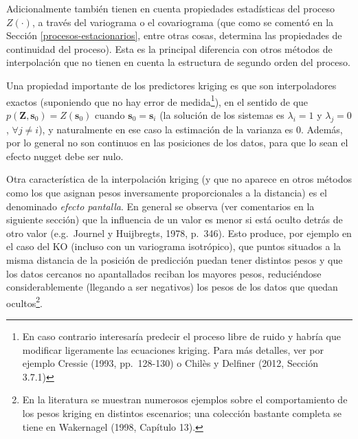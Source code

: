 \documentclass[
]{book}
\theoremstyle{break}
\theoremstyle{definition}
\theoremstyle{definition}
\theoremstyle{definition}
\theoremstyle{definition}
\theoremstyle{remark}
\begin{document}
Adicionalmente también tienen en cuenta propiedades estadísticas del proceso \(Z(\cdot)\), a través del variograma o el covariograma (que como se comentó en la Sección \ref{procesos-estacionarios}, entre otras cosas, determina las propiedades de continuidad del proceso).
Esta es la principal diferencia con otros métodos de interpolación que no tienen en cuenta la estructura de segundo orden del proceso.

Una propiedad importante de los predictores kriging es que son interpoladores exactos (suponiendo que no hay error de medida\footnote{En caso contrario interesaría predecir el proceso libre de ruido y habría que modificar ligeramente las ecuaciones kriging. Para más detalles, ver por ejemplo Cressie (1993, pp.~128-130) o Chilès y Delfiner (2012, Sección 3.7.1)}), en el sentido de que \(p(\mathbf{Z},\mathbf{s}_{0})=Z(\mathbf{s}_{0})\) cuando \(\mathbf{s}_{0}=\mathbf{s}_{i}\) (la solución de los sistemas es \(\lambda_{i} =1\) y \(\lambda_{j} =0\), \(\forall j\neq i\)), y naturalmente en ese caso la estimación de la varianza es 0.
Además, por lo general no son continuos en las posiciones de los datos, para que lo sean el efecto nugget debe ser nulo.

Otra característica de la interpolación kriging (y que no aparece en otros métodos como los que asignan pesos inversamente proporcionales a la distancia) es el denominado \emph{efecto pantalla}.
En general se observa (ver comentarios en la siguiente sección) que la influencia de un valor es menor si está oculto detrás de otro valor (e.g.~Journel y Huijbregts, 1978, p.~346).
Esto produce, por ejemplo en el caso del KO (incluso con un variograma isotrópico), que puntos situados a la misma distancia de la posición de predicción puedan tener distintos pesos y que los datos cercanos no apantallados reciban los mayores pesos, reduciéndose considerablemente (llegando a ser negativos) los pesos de los datos que quedan ocultos\footnote{En la literatura se muestran numerosos ejemplos sobre el comportamiento de los pesos kriging en distintos escenarios; una colección bastante completa se tiene en Wakernagel (1998, Capítulo 13).}.
\end{document}
